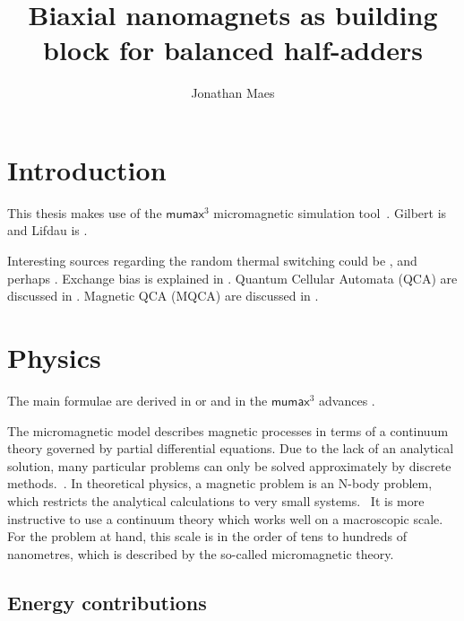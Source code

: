 \documentclass[10pt,a4paper]{article}
\author{Jonathan Maes}
\title{Biaxial nanomagnets as building block for balanced half-adders}
\newcommand{\mumax}{$\mathsf{mumax}^3$}
\begin{document}
\begin{titlingpage}
\maketitle
\end{titlingpage}

\newpage
{}

\tableofcontents
\newpage
{}

\section{Introduction}
This thesis makes use of the \mumax{} micromagnetic simulation tool~\cite{MuMax3}.
Gilbert is \cite{Gilbert1956} and Lifdau is \cite{LANDAU1992}.

Interesting sources regarding the random thermal switching could be \cite{ThermFluc_SingleDomain, RandomSwitch_MonteCarlo, Nonmonotonic_reversal}, and perhaps \cite{MagDynamics_JumpNoise}.
Exchange bias is explained in \cite{ExchangeBias, ExchangeBias_nanostructures, ExchangeBias_Mechanisms}.
Quantum Cellular Automata (QCA) are discussed in \cite{QCA_Algorithms, QCA_ImageRecognition, QCA_GameOfLife}. Magnetic QCA (MQCA) are discussed in \cite{MQCA_MajorityGate, MQCA_RoomTemp}.

\section{Physics}
The main formulae are derived in \cite{abert2013discrete} or \cite{NML_Carlton} and in the \mumax{} advances \cite{MuMax3_advances}.

The micromagnetic model describes magnetic processes in terms of a continuum theory governed by partial differential equations. Due to the lack of an analytical solution, many particular problems can only be solved approximately by discrete methods.~\cite{abert2013discrete}.
In theoretical physics, a magnetic problem is an N-body problem, which restricts the analytical calculations to very small systems.~\cite{abert2013discrete} It is more instructive to use a continuum theory which works well on a macroscopic scale. For the problem at hand, this scale is in the order of tens to hundreds of nanometres, which is described by the so-called micromagnetic theory.~\cite{abert2013discrete}

\subsection{Energy contributions}
\end{document}
